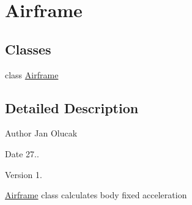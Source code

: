\hypertarget{group___airframe}{}\section{Airframe}
\label{group___airframe}
\subsection*{Classes}
\begin{DoxyCompactItemize}
\item 
class \hyperlink{class_airframe}{Airframe}
\end{DoxyCompactItemize}


\subsection{Detailed Description}
\begin{DoxyAuthor}{Author}
Jan Olucak 
\end{DoxyAuthor}
\begin{DoxyDate}{Date}
27.. 
\end{DoxyDate}
\begin{DoxyVersion}{Version}
1.
\end{DoxyVersion}
\hyperlink{class_airframe}{Airframe} class calculates body fixed acceleration 